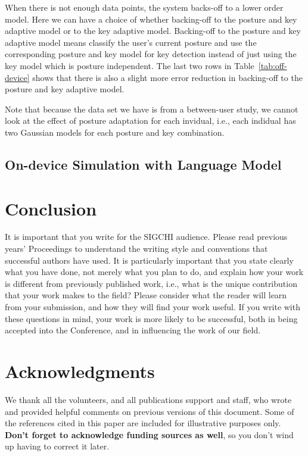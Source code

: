 \documentclass{sigchi}
\begin{document}
When there is not enough data points, the system backs-off to a lower order model.
Here we can have a choice of whether backing-off to the posture and key adaptive model or 
to the key adaptive model. Backing-off to the posture and key adaptive model means
classify the user's current posture and use the corresponding posture and key model for key detection instead
of just using the key model which is posture independent. The last two rows in 
Table~\ref{tab:off-device} shows that there is also a slight more error reduction  in backing-off to
the posture and key adaptive model.

Note that because the data set we have is from a between-user study, we cannot look
at the effect of posture adaptation for each invidual, i.e., each indidual has two Gaussian models
for each posture and key combination.

\subsection{On-device Simulation with Language Model}

\section{Conclusion}

It is important that you write for the SIGCHI audience.  Please read
previous years' Proceedings to understand the writing style and
conventions that successful authors have used.  It is particularly
important that you state clearly what you have done, not merely what
you plan to do, and explain how your work is different from previously
published work, i.e., what is the unique contribution that your work
makes to the field?  Please consider what the reader will learn from
your submission, and how they will find your work useful.  If you
write with these questions in mind, your work is more likely to be
successful, both in being accepted into the Conference, and in
influencing the work of our field.

\section{Acknowledgments}

We thank all the volunteers, and all publications support
and staff, who wrote and provided helpful comments on previous
versions of this document.  Some of the references cited in this paper
are included for illustrative purposes only.  \textbf{Don't forget
to acknowledge funding sources as well}, so you don't wind up
having to correct it later.
\end{document}
